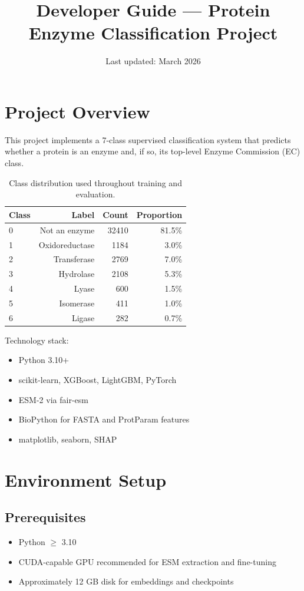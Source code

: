 \documentclass[11pt,a4paper]{article}
\title{Developer Guide --- Protein Enzyme Classification Project}
\author{}
\date{Last updated: March 2026}
\begin{document}
\maketitle

\tableofcontents
\newpage

\section{Project Overview}
This project implements a 7-class supervised classification system that predicts whether a
protein is an enzyme and, if so, its top-level Enzyme Commission (EC) class.

\begin{table}[H]
\centering
\caption{Class distribution used throughout training and evaluation.}
\begin{tabular}{lrrr}
\toprule
Class & Label & Count & Proportion \\
\midrule
0 & Not an enzyme & 32410 & 81.5\% \\
1 & Oxidoreductase & 1184 & 3.0\% \\
2 & Transferase & 2769 & 7.0\% \\
3 & Hydrolase & 2108 & 5.3\% \\
4 & Lyase & 600 & 1.5\% \\
5 & Isomerase & 411 & 1.0\% \\
6 & Ligase & 282 & 0.7\% \\
\bottomrule
\end{tabular}
\end{table}

Technology stack:
\begin{itemize}
\item Python 3.10+
\item scikit-learn, XGBoost, LightGBM, PyTorch
\item ESM-2 via fair-esm
\item BioPython for FASTA and ProtParam features
\item matplotlib, seaborn, SHAP
\end{itemize}

\section{Environment Setup}
\subsection{Prerequisites}
\begin{itemize}
\item Python $\ge$ 3.10
\item CUDA-capable GPU recommended for ESM extraction and fine-tuning
\item Approximately 12 GB disk for embeddings and checkpoints
\end{itemize}
\end{document}
